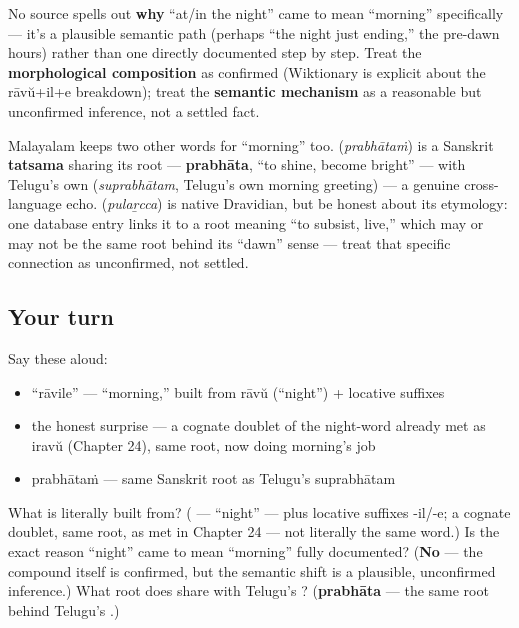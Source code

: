 \begin{culture}
No source spells out \textbf{why} \textquotedblleft{}at/in the night\textquotedblright{} came to mean \textquotedblleft{}morning\textquotedblright{} specifically — it's a plausible semantic path (perhaps \textquotedblleft{}the night just ending,\textquotedblright{} the pre-dawn hours) rather than one directly documented step by step. Treat the \textbf{morphological composition} as confirmed (Wiktionary is explicit about the rāvŭ+il+e breakdown); treat the \textbf{semantic mechanism} as a reasonable but unconfirmed inference, not a settled fact.
\end{culture}

\begin{culture}
Malayalam keeps two other words for \textquotedblleft{}morning\textquotedblright{} too. \textbf{} (\emph{prabhātaṁ}) is a Sanskrit \textbf{tatsama} sharing its root — \textbf{prabhāta}, \textquotedblleft{}to shine, become bright\textquotedblright{} — with Telugu's own \textbf{} (\emph{suprabhātam}, Telugu's own morning greeting) — a genuine cross-language echo. \textbf{} (\emph{pulaṟcca}) is native Dravidian, but be honest about its etymology: one database entry links it to a root meaning \textquotedblleft{}to subsist, live,\textquotedblright{} which may or may not be the same root behind its \textquotedblleft{}dawn\textquotedblright{} sense — treat that specific connection as unconfirmed, not settled.
\end{culture}

\subsection*{Your turn}
Say these aloud:

\begin{itemize}
\raggedright
  \item \textquotedblleft{}rāvile\textquotedblright{} — \textquotedblleft{}morning,\textquotedblright{} built from rāvŭ (\textquotedblleft{}night\textquotedblright{}) + locative suffixes
  \item the honest surprise — a cognate doublet of the night-word already met as iravŭ (Chapter 24), same root, now doing morning's job
  \item prabhātaṁ — same Sanskrit root as Telugu's suprabhātam
\end{itemize}

\begin{tcolorbox}[breakable,colback=teal!4,colframe=teal!35!black,title={Before you move on}]
What is  literally built from? (\textbf{} — \textquotedblleft{}night\textquotedblright{} — plus locative suffixes -il/-e; a cognate doublet, same root, as  met in Chapter 24 — not literally the same word.) Is the exact reason \textquotedblleft{}night\textquotedblright{} came to mean \textquotedblleft{}morning\textquotedblright{} fully documented? (\textbf{No} — the compound itself is confirmed, but the semantic shift is a plausible, unconfirmed inference.) What root does  share with Telugu's ? (\textbf{prabhāta} — the same root behind Telugu's .)
\end{tcolorbox}

